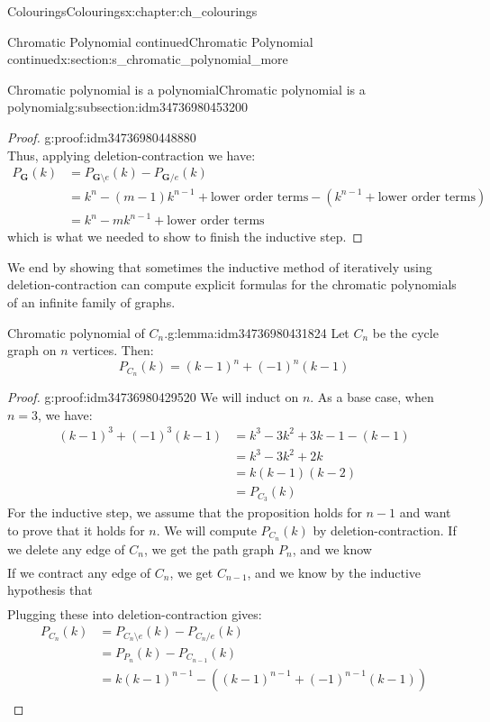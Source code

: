\documentclass[oneside,10pt,]{book}
\numberwithin{equation}{section}
\newcommand{\bfG}{\mathbf{G}}
\newcommand{\amp}{&}
\begin{document}
\begin{chapterptx}{Colourings}{}{Colourings}{}{}{x:chapter:ch_colourings}
\begin{sectionptx}{Chromatic Polynomial continued}{}{Chromatic Polynomial continued}{}{}{x:section:s_chromatic_polynomial_more}
\begin{subsectionptx}{Chromatic polynomial is a polynomial}{}{Chromatic polynomial is a polynomial}{}{}{g:subsection:idm34736980453200}
\begin{proof}{}{g:proof:idm34736980448880}
\begin{equation*}
\end{equation*}
Thus, applying deletion-contraction we have:%
%
\begin{align*}
P_\bfG(k) \amp = P_{\bfG\setminus e}(k)-P_{\bfG/e}(k) \\
\amp = k^n-(m-1)k^{n-1}+\text{lower order terms} - \left(k^{n-1}+\text{lower order terms} \right)\\
\amp = k^n-mk^{n-1}+\text{lower order terms}
\end{align*}
which is what we needed to show to finish the inductive step.%
\end{proof}
We end by showing that sometimes the inductive method of iteratively using deletion-contraction can compute explicit formulas for the chromatic polynomials of an infinite family of graphs.%
\begin{lemma}{Chromatic polynomial of \(C_n\).}{}{g:lemma:idm34736980431824}%
Let \(C_n\) be the cycle graph on \(n\) vertices.  Then:%
%
\begin{equation*}
P_{C_n}(k) = (k-1)^n+(-1)^n(k-1)
\end{equation*}
\end{lemma}
\begin{proof}{}{g:proof:idm34736980429520}
We will induct on \(n\).  As a base case, when \(n=3\), we have:%
%
\begin{align*}
(k-1)^3+(-1)^3(k-1)\amp =k^3-3k^2+3k-1-(k-1)\\
\amp=k^3-3k^2+2k\\
\amp =k(k-1)(k-2) \\
\amp=P_{C_3}(k)
\end{align*}
For the inductive step, we assume that the proposition holds for \(n-1\) and want to prove that it holds for \(n\).  We will compute \(P_{C_n}(k)\) by deletion-contraction.  If we delete any edge of \(C_n\), we get the path graph \(P_n\), and we know%
%
\begin{gather*}
\end{gather*}
If we contract any edge of \(C_n\), we get \(C_{n-1}\), and we know by the inductive hypothesis that%
%
\begin{gather*}
\end{gather*}
Plugging these into deletion-contraction gives:%
%
\begin{align*}
P_{C_n}(k) \amp = P_{C_n \setminus e}(k)-P_{C_n/e}(k) \\
\amp = P_{P_n}(k)-P_{C_{n-1}}(k) \\
\amp = k(k-1)^{n-1} - \left((k-1)^{n-1}+(-1)^{n-1}(k-1) \right)\\

\end{align*}
\end{proof}
\end{subsectionptx}
\end{sectionptx}
\end{chapterptx}
\end{document}
